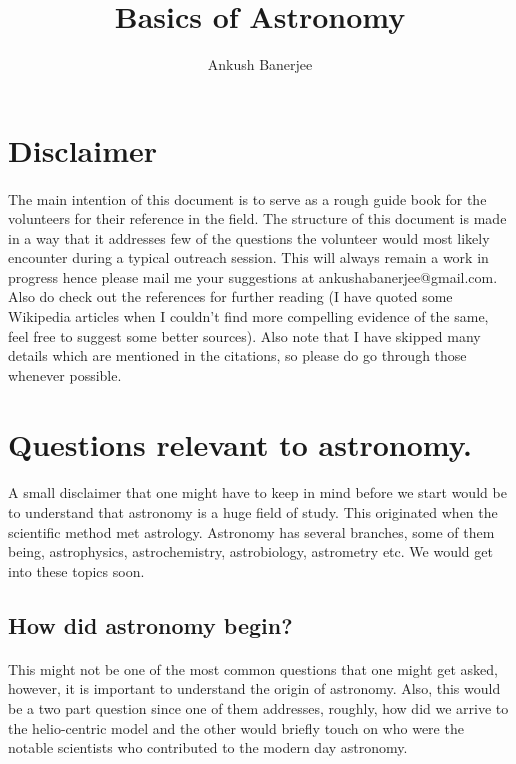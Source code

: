 \documentclass[a4paper,twoside]{article}
\title{Basics of Astronomy}
\author{Ankush Banerjee}
\numberwithin{equation}{section}
\begin{document}
\maketitle
\tableofcontents
\newpage
\section{Disclaimer}
\paragraph{}
The main intention of this document is to serve as a rough guide book for the volunteers for their reference in the field. The structure of this document is made in a way that it addresses few of the questions the volunteer would most likely encounter during a typical outreach session. This will always remain a work in progress hence please mail me your suggestions at ankushabanerjee@gmail.com. Also do check out the references for further reading (I have quoted some Wikipedia articles when I couldn't find more compelling evidence of the same, feel free to suggest some better sources). Also note that I have skipped many details which are mentioned in the citations, so please do go through those whenever possible.
\section{Questions relevant to astronomy.}
\paragraph{}
A small disclaimer that one might have to keep in mind before we start would be to understand that astronomy is a huge field of study. This originated when the scientific method met astrology. Astronomy has several branches, some of them being, astrophysics, astrochemistry, astrobiology, astrometry etc. We would get into these topics soon.
\subsection{How did astronomy begin?}
\paragraph{}
This might not be one of the most common questions that one might get asked, however, it is important to understand the origin of astronomy. Also, this would be a two part question since one of them addresses, roughly, how did we arrive to the helio-centric model and the other would briefly touch on who were the notable scientists who contributed to the modern day astronomy.
\end{document}
